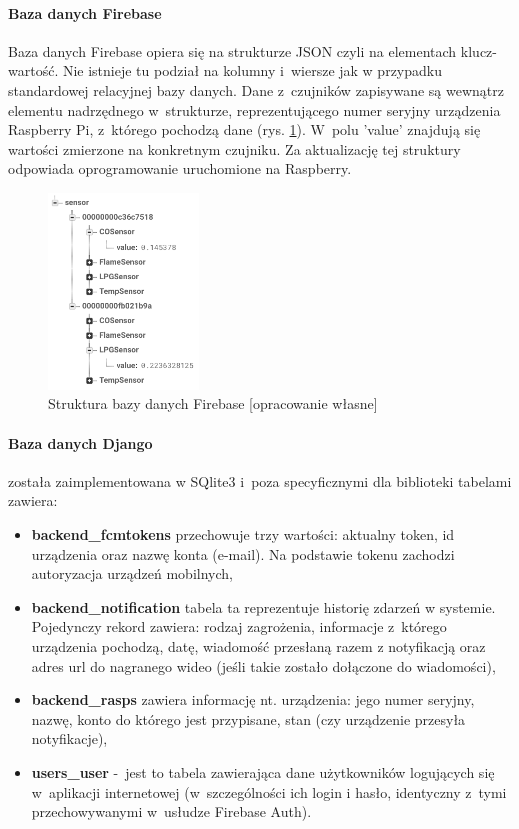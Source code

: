 \documentclass[polish,bachelor,a4paper,oneside]{ppfcmthesis}
\begin{document}
    \paragraph{Baza danych Firebase}
    Baza danych Firebase opiera się na strukturze JSON czyli na elementach klucz-wartość. Nie istnieje tu podział na kolumny i~wiersze jak w przypadku standardowej relacyjnej bazy danych. Dane z~czujników zapisywane są wewnątrz elementu nadrzędnego w~strukturze, reprezentującego numer seryjny urządzenia Raspberry Pi, z~którego pochodzą dane (rys. \ref{json}). W~polu 'value' znajdują się wartości zmierzone na konkretnym czujniku.  Za aktualizację tej struktury odpowiada oprogramowanie uruchomione na Raspberry.
    \begin{figure}[H]
        \centering
        \includegraphics[width=4cm]{firebasejson.png}
        \caption{Struktura bazy danych Firebase [opracowanie własne]}
        \label{json}
    \end{figure}

    \paragraph{Baza danych Django} została zaimplementowana w SQlite3 i~poza specyficznymi dla biblioteki tabelami zawiera:
    \begin{itemize}
        \item \textbf{backend\_fcmtokens} przechowuje trzy wartości: aktualny token, id urządzenia oraz nazwę konta (e-mail). Na podstawie tokenu zachodzi autoryzacja urządzeń mobilnych,
        \item \textbf{backend\_notification} tabela ta reprezentuje historię zdarzeń w systemie. Pojedynczy rekord zawiera: rodzaj zagrożenia, informacje z~którego urządzenia pochodzą, datę, wiadomość przesłaną razem z notyfikacją oraz adres url do nagranego wideo (jeśli takie zostało dołączone do wiadomości),
        \item \textbf{backend\_rasps} zawiera informację nt. urządzenia: jego numer seryjny, nazwę, konto do którego jest przypisane, stan (czy urządzenie przesyła notyfikacje),
        \item \textbf{users\_user} -~jest to tabela zawierająca dane użytkowników logujących się w~aplikacji internetowej (w~szczególności ich login i hasło, identyczny z~tymi przechowywanymi w~usłudze Firebase Auth).
    \end{itemize}
\end{document}
